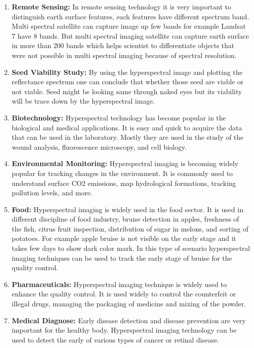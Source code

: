 \documentclass[document.tex]{subfiles}
\begin{document}
\begin{enumerate}
	\item \textbf{Remote Sensing:} In remote sensing technology it is very important to distinguish earth surface features, each features have different spectrum band. Multi spectral satellite can capture image up few bands for example Landsat 7 have 8 bands. But multi spectral imaging satellite can capture earth surface in more than 200 bands which helps scientist to differentiate objects that were not possible in multi spectral imaging because of spectral resolution.
	\item \textbf{Seed Viability Study: }By using the hyperspectral image and plotting the reflectance spectrum one can conclude that whether those seed are viable or not viable. Seed might be looking same through naked eyes but its viability will be trace down by the hyperspectral image.
	\item \textbf{Biotechnology:} Hyperspectral technology has become popular in the biological and medical applications. It is easy and quick to acquire the data that can be used in the laboratory. Mostly they are used in the study of the wound analysis, fluorescence microscopy, and cell biology.
	\item \textbf{Environmental Monitoring:} Hyperspectral imaging is becoming widely popular for tracking changes in the environment. It is commonly used to understand surface CO2 emissions, map hydrological formations, tracking pollution levels, and more.
	\item \textbf{Food: }Hyperspectral imaging is widely used in the food sector. It is used in different discipline of food industry, bruise detection in apples, freshness of the fish, citrus fruit inspection, distribution of sugar in melons, and sorting of potatoes. For example apple bruise is not visible on the early stage and it takes few days to show dark color mark. In this type of scenario hyperspectral imaging techniques can be used to track the early stage of bruise for the quality control.
	\item \textbf{Pharmaceuticals: } Hyperspectral imaging technique is widely used to enhance the quality control. It is used widely to control the counterfeit or illegal drugs, managing the packaging of medicine and mixing of the powder.
	\item \textbf{Medical Diagnose: }Early disease detection and disease prevention are very important for the healthy body. Hyperspectral imaging technology can be used to detect the early of various types of cancer or retinal disease.
\end{enumerate}
\end{document}
